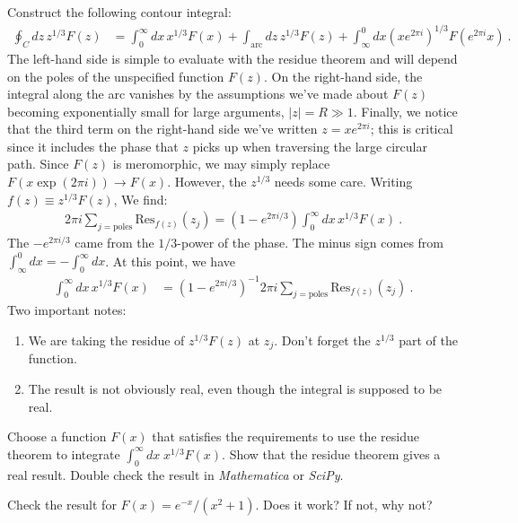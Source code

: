 Construct the following contour integral:
 \begin{align}
  \oint_C  dz\, z^{1/3} F(z) &= 
  \int_0^\infty dx \,  x^{1/3}F(x)
  + \int_{\text{arc}} dz \, z^{1/3} F(z)
  + \int_\infty^0 dx \left(x e^{2\pi i}\right)^{1/3} F\left(e^{2\pi i} x\right) \ .
 \end{align}
 The left-hand side is simple to evaluate with the residue theorem and will depend on the poles of the unspecified function $F(z)$. On the right-hand side, the integral along the arc vanishes by the assumptions we've made about $F(z)$ becoming exponentially small for large arguments, $|z|=R\gg 1$.  Finally, we notice that the third term on the right-hand side we've written $z=xe^{2\pi i}$; this is critical since it includes the phase that $z$ picks up when traversing the large circular path. Since $F(z)$ is meromorphic, we may simply replace $F(x\exp(2\pi i)) \to F(x)$. However, the $z^{1/3}$ needs some care. Writing $f(z)\equiv z^{1/3}F(z)$, We find:
 \begin{align}
  2\pi i \sum_{j=\text{poles}}  \text{Res}_{f(z)}(z_j)
  =
  \left(1-e^{2\pi i/3}\right) \int_0^\infty dx\,  x^{1/3} F(x) \ .
 \end{align}
The $-e^{2\pi i/3}$ came from the $1/3$-power of the phase. The minus sign comes from $\int_{\infty}^0 dx = -\int_0^\infty dx$. At this point, we have
\begin{align}
  \int_0^\infty dx \, x^{1/3}F(x)
  &= 
  \left(1-e^{2\pi i/3} \right)^{-1}
  2\pi i \sum_{j=\text{poles}}  \text{Res}_{f(z)}(z_j) \ .
\end{align}
Two important notes:
\begin{enumerate}
  \item We are taking the residue of $z^{1/3}F(z)$ at $z_j$. Don't forget the $z^{1/3}$ part of the function.
  \item The result is not obviously real, even though the integral is supposed to be real. 
\end{enumerate}
\begin{exercise}
Choose a function $F(x)$ that satisfies the requirements to use the residue theorem to integrate $\int_0^\infty dx\; x^{1/3}F(x)$. Show that the residue theorem gives a real result. Double check the result in \emph{Mathematica} or \emph{SciPy}.
\end{exercise}
\begin{exercise}
Check the result for $F(x) = e^{-x}/(x^2+1)$. Does it work? If not, why not?
\end{exercise}

